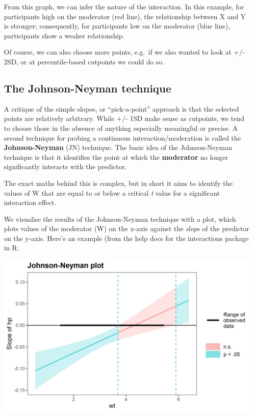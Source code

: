 \documentclass[
]{book}
\begin{document}
From this graph, we can infer the nature of the interaction. In this example, for participants high on the moderator (red line), the relationship between X and Y is stronger; consequently, for participants low on the moderator (blue line), participants show a weaker relationship.

Of course, we can also choose more points, e.g.~if we also wanted to look at +/- 2SD, or at percentile-based cutpoints we could do so.

\subsection{The Johnson-Neyman technique}\label{the-johnson-neyman-technique}

A critique of the simple slopes, or ``pick-a-point'' approach is that the selected points are relatively arbitrary. While +/- 1SD make sense as cutpoints, we tend to choose those in the absence of anything especially meaningful or precise. A second technique for probing a continuous interaction/moderation is called the \textbf{Johnson-Neyman} (JN) technique. The basic idea of the Johnson-Neyman technique is that it identifies the point at which the \textbf{moderator} no longer significantly interacts with the predictor.

The exact maths behind this is complex, but in short it aims to identify the values of W that are equal to or below a critical \emph{t} value for a significant interaction effect.

We visualise the results of the Johnson-Neyman technique with a plot, which plots values of the moderator (W) on the x-axis against the \emph{slope} of the predictor on the y-axis. Here's an example (from the help docs for the interactions package in R:

\begin{center}\includegraphics{img/j-n-plot-1} \end{center}
\end{document}
